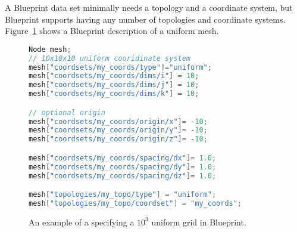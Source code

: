 A Blueprint data set minimally needs a topology and a coordinate system,
but Blueprint supports having any number of topologies and coordinate
systems.
%
Figure~\ref{ex:blueprint} shows a Blueprint description of a uniform mesh.

\begin{figure}
\begin{lstlisting}[language=C++]
Node mesh;
// 10x10x10 uniform cooridinate system
mesh["coordsets/my_coords/type"]="uniform";
mesh["coordsets/my_coords/dims/i"] = 10;
mesh["coordsets/my_coords/dims/j"] = 10;
mesh["coordsets/my_coords/dims/k"] = 10;

// optional origin
mesh["coordsets/my_coords/origin/x"]= -10;
mesh["coordsets/my_coords/origin/y"]= -10;
mesh["coordsets/my_coords/origin/z"]= -10;

mesh["coordsets/my_coords/spacing/dx"]= 1.0;
mesh["coordsets/my_coords/spacing/dy"]= 1.0;
mesh["coordsets/my_coords/spacing/dz"]= 1.0;

mesh["topologies/my_topo/type"] = "uniform";
mesh["topologies/my_topo/coordset"] = "my_coords";
\end{lstlisting}
\caption{\label{ex:blueprint}An example of a specifying a $10^3$ uniform grid in Blueprint.}
\end{figure}
